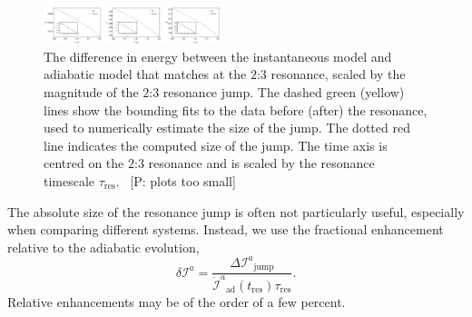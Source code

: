 \documentclass[aps,prd,amsfonts,amssymb,amsmath,nofootinbib,showpacs,superscriptaddress,twocolumn,floatfix]{revtex4-1}
\newcommand{\sub}[1]{\ensuremath{_\mathrm{#1}}}
\newcommand{\pcm}[1]{{\color{blue}~\textsf{[P: #1]}}}
\begin{document}

\begin{figure}
\centering
\includegraphics[width=0.46\textwidth]{Fig_res_jump_calc}
\caption{\label{fig:res-jump-calc}The difference in energy between the instantaneous model and adiabatic model that matches at the $2$:$3$ resonance, scaled by the magnitude of the $2$:$3$ resonance jump. The dashed green (yellow) lines show the bounding fits to the data before (after) the resonance, used to numerically estimate the size of the jump. The dotted red line indicates the computed size of the jump. The time axis is centred on the $2$:$3$ resonance and is scaled by the resonance timescale $\tau\sub{res}$. \pcm{plots too small}}
\end{figure}

The absolute size of the resonance jump is often not particularly useful, especially when comparing different systems. Instead, we use the fractional enhancement relative to the adiabatic evolution,
\begin{equation}
\label{eq:res-jump-ratio}
\delta \mathcal{I}^a = \frac{\Delta \mathcal{I}^a\sub{jump}}{\dot{\mathcal{I}}^a\sub{ad}(t\sub{res})\tau\sub{res}}.
\end{equation}
Relative enhancements may be of the order of a few percent.
\end{document}

